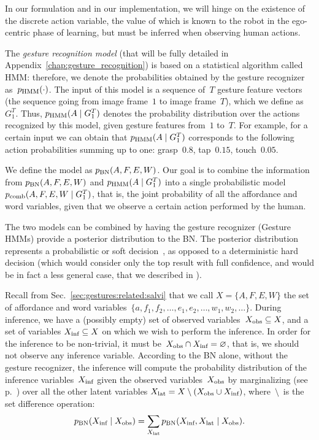 In our formulation and in our implementation, we will hinge on the existence of the discrete action variable, the value of which is known to the robot in the ego-centric phase of learning, but must be inferred when observing human actions.

The \emph{gesture recognition model} (that will be fully detailed in Appendix~\ref{chap:gesture_recognition})
is based on a statistical algorithm called \ac{HMM}: therefore, we denote the probabilities obtained by the gesture recognizer as~$p_{\text{HMM}}(\cdot)$.
The input of this model is a sequence of~$T$ gesture feature vectors (the sequence going from image frame~$1$ to image frame~$T$), which we define as~$G_1^T$.
Thus, $p_{\text{HMM}}(A \mid G_1^T)$ denotes the probability distribution over the actions recognized by this model, given gesture features from~$1$ to~$T$.
For example, for a certain input we can obtain that $p_{\text{HMM}}(A \mid G_1^T)$ corresponds to the following action probabilities summing up to one: grasp~$0.8$, tap~$0.15$, touch~$0.05$.

We define the \AffWords{} model as $p_{\text{BN}}(A, F, E, W)$.
Our goal is to combine the information from $p_{\text{BN}}(A, F, E, W)$ and $p_{\text{HMM}}(A \mid G_1^T)$ into a single probabilistic model $p_\text{comb}(A, F, E, W \mid G_1^T)$, that is, the joint probability of all the affordance and word variables, given that we observe a certain action performed by the human.

The two models can be combined by having the gesture recognizer (Gesture \acp{HMM}) provide a posterior distribution to the \ac{BN}.
The posterior distribution represents a probabilistic or soft decision~\cite{pan:2006:ictai}, as opposed to a deterministic hard decision (which would consider only the top result with full confidence, and would be in fact a less general case, that we described in \cite{saponaro:2017:glu}).

Recall from Sec.~\ref{sec:gestures:related:salvi} that we call $X = \{A, F, E, W\}$ the set of affordance and word variables~$\{a, f_1, f_2, \dots, e_1, e_2, \dots, w_1, w_2, \dots\}$.
During inference, we have a (possibly empty) set of observed variables~$X_\text{obs} \subseteq X$, and a set of variables $X_\text{inf} \subseteq X$ on which we wish to perform the inference.
In order for the inference to be non-trivial, it must be~$X_\text{obs} \cap X_\text{inf} = \varnothing$, that is, we should not observe any inference variable.
According to the \ac{BN} alone, without the gesture recognizer, the inference will compute the probability distribution of the inference variables~$X_\text{inf}$ given the observed variables~$X_\text{obs}$ by marginalizing (see p.~\pageref{para:marginalization}) over all the other latent variables $X_\text{lat} = X \setminus (X_\text{obs} \cup X_\text{inf})$, where~$\setminus$~is the set difference operation:
\begin{equation*}
 p_{\text{BN}}(X_\text{inf} \mid X_\text{obs}) = \sum_{X_\text{lat}} p_{\text{BN}}(X_\text{inf}, X_\text{lat} \mid X_\text{obs}).
\end{equation*}

